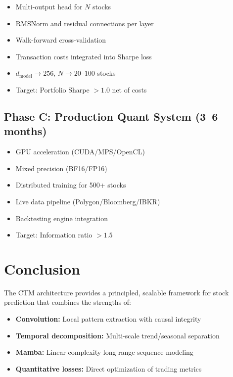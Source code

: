 \documentclass[11pt,a4paper]{article}
\begin{document}
\begin{itemize}
  \item Multi-output head for $N$ stocks
  \item RMSNorm and residual connections per layer
  \item Walk-forward cross-validation
  \item Transaction costs integrated into Sharpe loss
  \item $d_{\text{model}} \to 256$, $N \to 20$--$100$ stocks
  \item Target: Portfolio Sharpe $>1.0$ net of costs
\end{itemize}

\subsection{Phase C: Production Quant System (3--6 months)}

\begin{itemize}
  \item GPU acceleration (CUDA/MPS/OpenCL)
  \item Mixed precision (BF16/FP16)
  \item Distributed training for 500+ stocks
  \item Live data pipeline (Polygon/Bloomberg/IBKR)
  \item Backtesting engine integration
  \item Target: Information ratio $>1.5$
\end{itemize}

\section{Conclusion}

The CTM architecture provides a principled, scalable framework for stock
prediction that combines the strengths of:
\begin{itemize}
  \item \textbf{Convolution:} Local pattern extraction with causal integrity
  \item \textbf{Temporal decomposition:} Multi-scale trend/seasonal separation
  \item \textbf{Mamba:} Linear-complexity long-range sequence modeling
  \item \textbf{Quantitative losses:} Direct optimization of trading metrics
\end{itemize}
\end{document}
